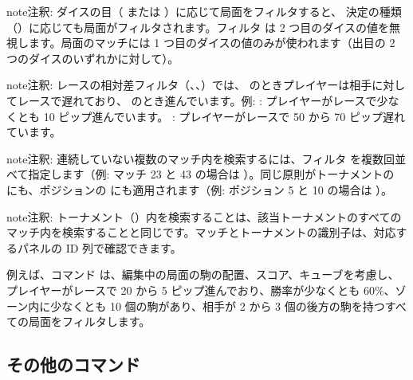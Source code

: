 \documentclass[letterpaper,10pt,dvipdfmx]{sphinxmanual}
\begin{document}
\begin{sphinxadmonition}{note}{注釈:}
\sphinxAtStartPar
ダイスの目（ または ）に応じて局面をフィルタすると、 決定の種類（）に応じても局面がフィルタされます。フィルタ  は 2 つ目のダイスの値を無視します。局面のマッチには 1 つ目のダイスの値のみが使われます（出目の 2 つのダイスのいずれかに対して）。
\end{sphinxadmonition}

\begin{sphinxadmonition}{note}{注釈:}
\sphinxAtStartPar
レースの相対差フィルタ（、、）では、 のときプレイヤーは相手に対してレースで遅れており、 のとき進んでいます。例:  : プレイヤーがレースで少なくとも 10 ピップ進んでいます。 : プレイヤーがレースで 50 から 70 ピップ遅れています。
\end{sphinxadmonition}

\begin{sphinxadmonition}{note}{注釈:}
\sphinxAtStartPar
連続していない複数のマッチ内を検索するには、フィルタ  を複数回並べて指定します（例: マッチ 23 と 43 の場合は  ）。同じ原則がトーナメントの  にも、ポジションの  にも適用されます（例: ポジション 5 と 10 の場合は  ）。
\end{sphinxadmonition}

\begin{sphinxadmonition}{note}{注釈:}
\sphinxAtStartPar
トーナメント（）内を検索することは、該当トーナメントのすべてのマッチ内を検索することと同じです。マッチとトーナメントの識別子は、対応するパネルの ID 列で確認できます。
\end{sphinxadmonition}

\sphinxAtStartPar
例えば、コマンド  は、編集中の局面の駒の配置、スコア、キューブを考慮し、プレイヤーがレースで 20 から 5 ピップ進んでおり、勝率が少なくとも 60\%、ゾーン内に少なくとも 10 個の駒があり、相手が 2 から 3 個の後方の駒を持つすべての局面をフィルタします。


\subsection{その他のコマンド}
\label{\detokenize{cmd_mode:commandes-diverses}}\label{\detokenize{cmd_mode:cmd-misc}}
\end{document}
